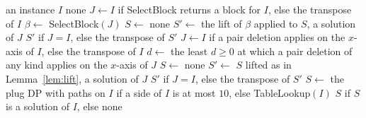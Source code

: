 \documentclass[11pt]{article}
\begin{document}
\begin{algorithm}[htbp]
\caption{Construct$(I)$, returning a solution or none}\label{alg:construct}
\begin{algorithmic}[1]
\Require an instance $I$
 \Return none \EndIf
\State \Return {}
\Statex
{}
   \Return {} \EndIf
  \State $J\gets I$ if SelectBlock returns a block for $I$, else the transpose of $I$
  \State $\beta\gets$ SelectBlock$(J)$
   \Return {} \EndIf
  \State $S\gets$ 
   \Return none \EndIf
  \State $S'\gets$ the lift of $\beta$ applied to $S$, a solution of $J$
  \State \Return $S'$ if $J=I$, else the transpose of $S'$
\EndFunction
{}
   \Return {} \EndIf
  \State $J\gets I$ if a pair deletion applies on the $x$-axis of $I$, else the transpose of $I$
  \State $d\gets$ the least $d\ge 0$ at which a pair deletion of any kind applies on the $x$-axis of $J$
   \Return {} \EndIf
  \State $S\gets$ 
   \Return none \EndIf
  \State $S'\gets$ $S$ lifted as in Lemma~\ref{lem:lift}, a solution of $J$
  \State \Return $S'$ if $J=I$, else the transpose of $S'$
\EndFunction
{}
  \State $S\gets$ the plug DP with paths on $I$ if a side of $I$ is at most $10$, else
    TableLookup$(I)$\label{line:final}
  \State \Return $S$ if $S$ is a solution of $I$, else none
\EndFunction
\end{algorithmic}
\end{algorithm}

\end{document}
